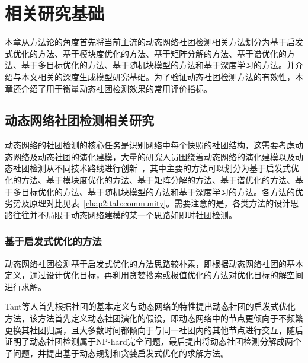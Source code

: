 \baselineskip 20pt

\chapter{相关研究基础}
\label{chap:2}
本章从方法论的角度首先将当前主流的动态网络社团检测相关方法划分为基于启发式优化的方法、基于模块度优化的方法、基于矩阵分解的方法、基于谱优化的方法、基于多目标优化的方法、基于随机块模型的方法和基于深度学习的方法。并介绍与本文相关的深度生成模型研究基础。为了验证动态社团检测方法的有效性，本章还介绍了用于衡量动态社团检测效果的常用评价指标。

\section{动态网络社团检测相关研究}
动态网络的社团检测的核心任务是识别网络中每个快照的社团结构，这需要考虑动态网络及动态社团的演化建模，大量的研究人员围绕着动态网络的演化建模以及动态社团检测从不同技术路线进行创新~\cite{JSJA2023S2059}，其中主要的方法可以划分为基于启发式优化的方法、基于模块度优化的方法、基于矩阵分解的方法、基于谱优化的方法、基于多目标优化的方法、基于随机块模型的方法和基于深度学习的方法。各方法的优劣势及原理对比见表~\ref{chap2:tab:community}。需要注意的是，各类方法的设计思路往往并不局限于动态网络建模的某一个思路如即时社团检测。


\subsection{基于启发式优化的方法}
动态网络社团检测基于启发式优化的方法思路较朴素，即根据动态网络社团的基本定义，通过设计优化目标，再利用贪婪搜索或极值优化的方法对优化目标的解空间进行求解。

Tant等人\cite{tantipathananandh2007framework}首先根据社团的基本定义与动态网络的特性提出动态社团的启发式优化方法，该方法首先定义动态社团演化的假设，即动态网络中的节点更倾向于不频繁更换其社团归属，且大多数时间都倾向于与同一社团内的其他节点进行交互，随后证明了动态社团检测属于NP-hard完全问题，最后提出将动态社团检测分解成两个子问题，并提出基于动态规划和贪婪启发式优化的求解方法。

